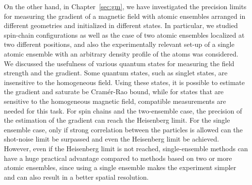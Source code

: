 On the other hand, in Chapter~\ref{sec:gm}, we have investigated the precision limits for measuring the gradient of a magnetic field with atomic ensembles arranged in different geometries and initialized in different states.
In particular, we studied spin-chain configurations as well as the case of two atomic ensembles localized at two different positions, and also the experimentally relevant set-up of a single atomic ensemble with an arbitrary density profile of the atoms was considered.
We discussed the usefulness of various quantum states for measuring the field strength and the gradient.
Some quantum states, such as singlet states, are insensitive to the homogeneous field.
Using these states, it is possible to estimate the gradient and saturate be Cramér-Rao bound, while for states that are sensitive to the homogeneous magnetic field, compatible measurements are needed for this task.
For spin chains and the two-ensemble case, the precision of the estimation of the gradient can reach the Heisenberg limit.
For the single ensemble case, only if strong correlation between the particles is allowed can the shot-noise limit be surpassed and even the Heisenberg limit be achieved.
However, even if the Heisenberg limit is not reached, single-ensemble methods can have a huge practical advantage compared to methods based on two or more atomic ensembles, since using a single ensemble makes the experiment simpler and can also result in a better spatial resolution.
